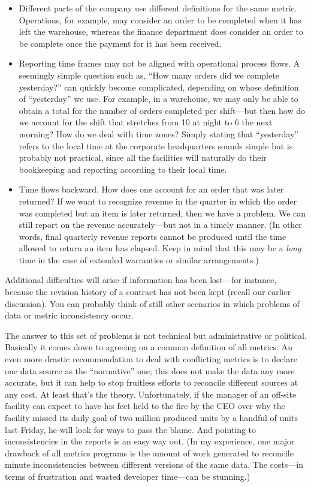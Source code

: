 \begin{itemize}
\item Different parts of the company use different definitions for the
  same metric. Operations, for example, may consider an order to be
  completed when it has left the warehouse, whereas the finance
  department does consider an order to be complete once the payment
  for it has been received.
\item Reporting time frames may not be aligned with operational
  process flows. A seemingly simple question such as, ``How many orders
  did we complete yesterday?'' can quickly become complicated,
  depending on whose definition of ``yesterday'' we use.  For example,
  in a warehouse, we may only be able to obtain a total for the number
  of orders completed per shift---but then how do we account for the
  shift that stretches from 10 at night to 6 the next morning? How do\vadjust{\pagebreak}
  we deal with time zones? Simply stating that ``yesterday'' refers to
  the local time at the corporate headquarters sounds simple but is
  probably not practical, since all the facilities will naturally do
  their bookkeeping and reporting according to their local time.
\item Time flows backward. How does one account for an order that was
  later returned? If we want to recognize revenue in the quarter in
  which the order was completed but an item is later returned, then we
  have a problem. We can still report on the revenue accurately---but
  not in a timely manner. (In other words, final quarterly revenue
  reports cannot be produced until the time allowed to return an item
  has elapsed. Keep in mind that this may be a \emph{long} time in the
  case of extended warranties or similar arrangements.)
\end{itemize}
        
Additional difficulties will arise if information has been lost---for
instance, because the revision history of a contract has not been kept
(recall our earlier discussion). You can probably think of still other
scenarios in which problems of data or metric inconsistency occur.
    
The answer to this set of problems is not technical but
administrative or political. Basically it comes down to agreeing on a
common definition of all metrics. An even more drastic recommendation
to deal with conflicting metrics is to declare one data source as the
``normative'' one; this does not make the data any more accurate, but
it can help to stop fruitless efforts to reconcile different sources
at any cost. At least that's the theory.  Unfortunately, if the
manager of an off-site facility can expect to have his feet held to
the fire by the CEO over why the facility missed its daily goal of two
million produced units by a handful of units last Friday, he will look
for ways to pass the blame. And pointing to inconsistencies in the
reports is an easy way out. (In my experience, one major drawback of
all metrics programs is the amount of work generated to reconcile
minute inconsistencies between different versions of the same data.
The costs---in terms of frustration and wasted developer time---can be
stunning.)
    
